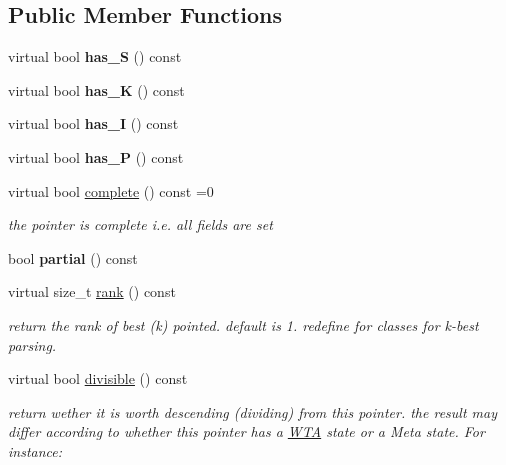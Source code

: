\subsection*{Public Member Functions}
\begin{DoxyCompactItemize}
\item 
\mbox{\label{classPointer_a2a45530c7efca1b398d90a773fdb3c70}} 
virtual bool {\bfseries has\+\_\+S} () const
\item 
\mbox{\label{classPointer_a66999c2d23c4b592228f1e74a96e0315}} 
virtual bool {\bfseries has\+\_\+K} () const
\item 
\mbox{\label{classPointer_a7018d6fde0393288fbd7ed5c1ffe9e5b}} 
virtual bool {\bfseries has\+\_\+I} () const
\item 
\mbox{\label{classPointer_a96063327a69b47d288f345b0d2f4b42b}} 
virtual bool {\bfseries has\+\_\+P} () const
\item 
\mbox{\label{classPointer_a3fa3fb5df21abf35c02c321611d85a3c}} 
virtual bool \mbox{\hyperlink{classPointer_a3fa3fb5df21abf35c02c321611d85a3c}{complete}} () const =0
\begin{DoxyCompactList}\small\item\em the pointer is complete i.\+e. all fields are set \end{DoxyCompactList}\item 
\mbox{\label{classPointer_aa682c210e4ae3ef7268db1ee5bcf9f9d}} 
bool {\bfseries partial} () const
\item 
\mbox{\label{classPointer_a8ded051c871b7fccfb6b2a20b8920cab}} 
virtual size\+\_\+t \mbox{\hyperlink{classPointer_a8ded051c871b7fccfb6b2a20b8920cab}{rank}} () const
\begin{DoxyCompactList}\small\item\em return the rank of best (k) pointed. default is 1. redefine for classes for k-\/best parsing. \end{DoxyCompactList}\item 
virtual bool \mbox{\hyperlink{classPointer_a51529c3e4714cafc28ba07da36078618}{divisible}} () const
\begin{DoxyCompactList}\small\item\em return wether it is worth descending (dividing) from this pointer. the result may differ according to whether this pointer has a \mbox{\hyperlink{classWTA}{W\+TA}} state or a Meta state. For instance\+: \end{DoxyCompactList}\item 

\end{DoxyCompactItemize}
